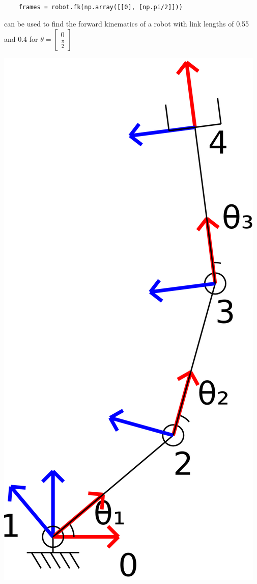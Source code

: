 \documentclass{16384_doc} %
\begin{document}
\begin{questions}
\begin{verbatim}
    
    frames = robot.fk(np.array([[0], [np.pi/2]]))
    \end{verbatim}
    can be used to find the forward kinematics of a robot with link lengths of
    0.55 and 0.4 for $\theta = \begin{bmatrix} 0 \\ \frac\pi2 \end{bmatrix}$
    \begin{center}
    \includegraphics[scale=0.07]{generated_figures/RRR_alltheframes.png}
    \end{center}

\end{questions}
\end{document}
